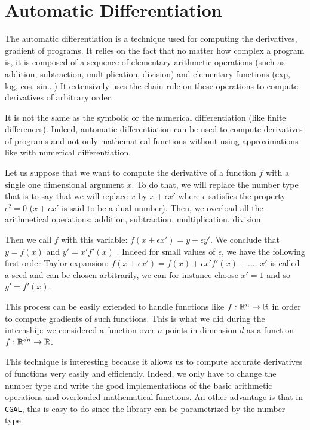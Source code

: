 \chapter{Automatic Differentiation}
\label{appendix:ad}

The automatic differentiation is a technique used for computing the derivatives,
gradient of programs. It relies on the fact that no matter how complex a program
is, it is composed of a sequence of elementary arithmetic operations (such as
addition, subtraction, multiplication, division) and elementary functions (exp,
log, cos, sin...) It extensively uses the chain rule on these operations to
compute derivatives of arbitrary order.

It is not the same as the symbolic or the numerical differentiation (like finite
differences). Indeed, automatic differentiation can be used to compute
derivatives of programs and not only mathematical functions without using
approximations like with numerical differentiation.

Let us suppose that we want to compute the derivative of a function $ f $ with a
single one dimensional argument $ x $. To do that, we will replace the number
type that is to say that we will replace $ x $ by $ x + \epsilon x' $ where $
\epsilon $ satisfies the property $ \epsilon^2 = 0 $ ($ x + \epsilon x' $ is
said to be a dual number). Then, we overload all the arithmetical operations:
addition, subtraction, multiplication, division.

Then we call $ f $ with this variable: $ f(x + \epsilon x') = y + \epsilon y' $.
We conclude that $ y = f(x) $ and $ y' = x' f'(x) $ . Indeed for small values of
$ \epsilon $, we have the following first order Taylor expansion: $ f(x +
\epsilon x') = f(x) + \epsilon x' f'(x) + ... $. $ x' $ is called a seed and can
be chosen arbitrarily, we can for instance choose $ x ' = 1 $ and so $ y' =
f'(x) $.

This process can be easily extended to handle functions like $ f : \mathbb{R}^n
\rightarrow \mathbb{R} $ in order to compute gradients of such functions. This is what
we did during the internship: we considered a function over $ n $ points in
dimension $ d $ as a function $ f : \mathbb{R}^{dn} \rightarrow \mathbb{R} $.

This technique is interesting because it allows us to compute accurate
derivatives of functions very easily and efficiently. Indeed, we only have to
change the number type and write the good implementations of the basic
arithmetic operations and overloaded mathematical functions.  An other advantage
is that in \texttt{CGAL}, this is easy to do since the library can be
parametrized by the number type.


